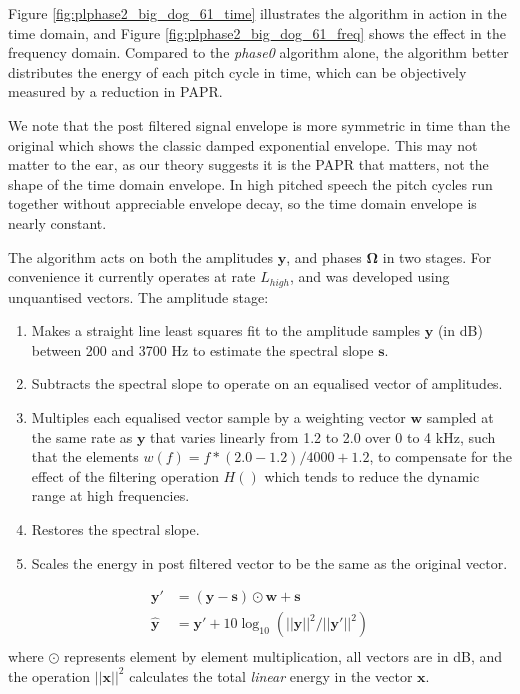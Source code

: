 \documentclass{article}
\begin{document}
Figure \ref{fig:plphase2_big_dog_61_time} illustrates the algorithm in action in the time domain, and Figure \ref{fig:plphase2_big_dog_61_freq} shows the effect in the frequency domain.  Compared to the \emph{phase0} algorithm alone, the algorithm better distributes the energy of each pitch cycle in time, which can be objectively measured by a reduction in PAPR.

We note that the post filtered signal envelope is more symmetric in time than the original which shows the classic damped exponential envelope.  This may not matter to the ear, as our theory suggests it is the PAPR that matters, not the shape of the time domain envelope.  In high pitched speech the pitch cycles run together without appreciable envelope decay, so the time domain envelope is nearly constant.

The algorithm acts on both the amplitudes $\mathbf{y}$, and phases ${\mathbf{\Omega}}$ in two stages.  For convenience it currently operates at rate $L_{high}$, and was developed using unquantised vectors. The amplitude stage:
 \begin{enumerate}
 \item Makes a straight line least squares fit to the amplitude samples $\mathbf{y}$ (in dB) between 200 and 3700 Hz to estimate the spectral slope $\mathbf{s}$.
 \item Subtracts the spectral slope to operate on an equalised vector of amplitudes.
 \item Multiples each equalised vector sample by a weighting vector $\mathbf{w}$ sampled at the same rate as $\mathbf{y}$ that varies linearly from 1.2 to 2.0 over 0 to 4 kHz, such that the elements $w(f)=f*(2.0-1.2)/4000+1.2$, to compensate for the effect of the filtering operation $H()$ which tends to reduce the dynamic range at high frequencies.
 \item Restores the spectral slope.
 \item Scales the energy in post filtered vector to be the same as the original vector. 
 \end{enumerate}
 
\begin{equation}
\begin{split}
\mathbf{y}' &= (\mathbf{y}-\mathbf{s})\odot\mathbf{w} + \mathbf{s} \\
\hat{\mathbf{y}} &= \mathbf{y}'+10\log_{10}(||\mathbf{y}||^2/||\mathbf{y'}||^2) \\
\end{split}
\end{equation}
where $\odot$ represents element by element multiplication, all vectors are in dB, and the operation $||\mathbf{x}||^2$ calculates the total \emph{linear} energy in the vector $\mathbf{x}$.
\end{document}
